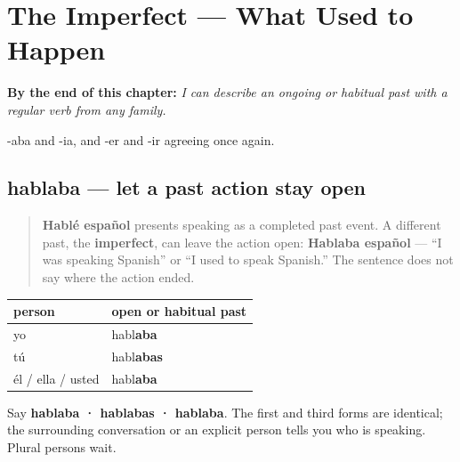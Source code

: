 
\chapter{The Imperfect --- What Used to Happen}
\label{ch:spanish-imperfecto}

\begin{chapteropening}
\textbf{By the end of this chapter:} \emph{I can describe an ongoing or habitual past with a regular verb from any family.}

-aba and -ia, and -er and -ir agreeing once again.
\end{chapteropening}

\section[hablaba]{hablaba — let a past action stay open}

\label{lesson:ES-C16-imperfecto}



\begin{quote}
\textbf{Hablé español} presents speaking as a completed past event. A different past, the \textbf{imperfect}, can leave the action open: \textbf{Hablaba español} — “I was speaking Spanish” or “I used to speak Spanish.” The sentence does not say where the action ended.
\end{quote}

\begin{grammarlens}[title={Grammar Lens: three familiar persons}]
\noindent
\begin{tabularx}{\linewidth}{@{}>{\raggedright\arraybackslash}X>{\raggedright\arraybackslash}X@{}}
\toprule
\textbf{person} & \textbf{open or habitual past} \\
\midrule
yo & habl\textbf{aba} \\
tú & habl\textbf{abas} \\
él / ella / usted & habl\textbf{aba} \\
\bottomrule
\end{tabularx}

Say \textbf{hablaba · hablabas · hablaba}. The first and third forms are identical; the surrounding conversation or an explicit person tells you who is speaking. Plural persons wait.
\end{grammarlens}

